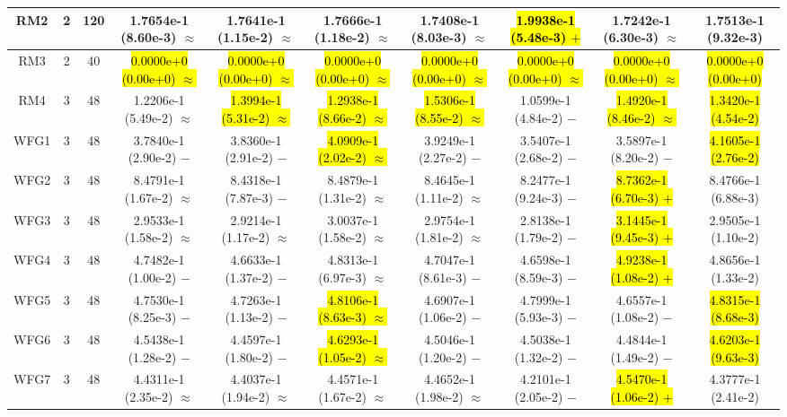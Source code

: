 \documentclass[journal]{IEEEtran}
\begin{document}
\begin{table*}[htbp]
\begin{tabular}{cccccccccc}
\hline
\multirow{1}{*}{RM2}&2&120&1.7654e-1 (8.60e-3) $\approx$&1.7641e-1 (1.15e-2) $\approx$&1.7666e-1 (1.18e-2) $\approx$&1.7408e-1 (8.03e-3) $\approx$&\hl{1.9938e-1 (5.48e-3) $+$}&1.7242e-1 (6.30e-3) $\approx$&1.7513e-1 (9.32e-3)\\
\hline
\multirow{1}{*}{RM3}&2&40&\hl{0.0000e+0 (0.00e+0) $\approx$}&\hl{0.0000e+0 (0.00e+0) $\approx$}&\hl{0.0000e+0 (0.00e+0) $\approx$}&\hl{0.0000e+0 (0.00e+0) $\approx$}&\hl{0.0000e+0 (0.00e+0) $\approx$}&\hl{0.0000e+0 (0.00e+0) $\approx$}&\hl{0.0000e+0 (0.00e+0)}\\
\hline
\multirow{1}{*}{RM4}&3&48&1.2206e-1 (5.49e-2) $\approx$&\hl{1.3994e-1 (5.31e-2) $\approx$}&\hl{1.2938e-1 (8.66e-2) $\approx$}&\hl{1.5306e-1 (8.55e-2) $\approx$}&1.0599e-1 (4.84e-2) $-$&\hl{1.4920e-1 (8.46e-2) $\approx$}&\hl{1.3420e-1 (4.54e-2)}\\
\hline
\multirow{1}{*}{WFG1}&3&48&3.7840e-1 (2.90e-2) $-$&3.8360e-1 (2.91e-2) $-$&\hl{4.0909e-1 (2.02e-2) $\approx$}&3.9249e-1 (2.27e-2) $-$&3.5407e-1 (2.68e-2) $-$&3.5897e-1 (8.20e-2) $-$&\hl{4.1605e-1 (2.76e-2)}\\
\hline
\multirow{1}{*}{WFG2}&3&48&8.4791e-1 (1.67e-2) $\approx$&8.4318e-1 (7.87e-3) $-$&8.4879e-1 (1.31e-2) $\approx$&8.4645e-1 (1.11e-2) $\approx$&8.2477e-1 (9.24e-3) $-$&\hl{8.7362e-1 (6.70e-3) $+$}&8.4766e-1 (6.88e-3)\\
\hline
\multirow{1}{*}{WFG3}&3&48&2.9533e-1 (1.58e-2) $\approx$&2.9214e-1 (1.17e-2) $\approx$&3.0037e-1 (1.58e-2) $\approx$&2.9754e-1 (1.81e-2) $\approx$&2.8138e-1 (1.79e-2) $-$&\hl{3.1445e-1 (9.45e-3) $+$}&2.9505e-1 (1.10e-2)\\
\hline
\multirow{1}{*}{WFG4}&3&48&4.7482e-1 (1.00e-2) $-$&4.6633e-1 (1.37e-2) $-$&4.8313e-1 (6.97e-3) $\approx$&4.7047e-1 (8.61e-3) $-$&4.6598e-1 (8.59e-3) $-$&\hl{4.9238e-1 (1.08e-2) $+$}&4.8656e-1 (1.33e-2)\\
\hline
\multirow{1}{*}{WFG5}&3&48&4.7530e-1 (8.25e-3) $-$&4.7263e-1 (1.13e-2) $-$&\hl{4.8106e-1 (8.63e-3) $\approx$}&4.6907e-1 (1.06e-2) $-$&4.7999e-1 (5.93e-3) $-$&4.6557e-1 (1.08e-2) $-$&\hl{4.8315e-1 (8.68e-3)}\\
\hline
\multirow{1}{*}{WFG6}&3&48&4.5438e-1 (1.28e-2) $-$&4.4597e-1 (1.80e-2) $-$&\hl{4.6293e-1 (1.05e-2) $\approx$}&4.5046e-1 (1.20e-2) $-$&4.5038e-1 (1.32e-2) $-$&4.4844e-1 (1.49e-2) $-$&\hl{4.6203e-1 (9.63e-3)}\\
\hline
\multirow{1}{*}{WFG7}&3&48&4.4311e-1 (2.35e-2) $\approx$&4.4037e-1 (1.94e-2) $\approx$&4.4571e-1 (1.67e-2) $\approx$&4.4652e-1 (1.98e-2) $\approx$&4.2101e-1 (2.05e-2) $-$&\hl{4.5470e-1 (1.06e-2) $+$}&4.3777e-1 (2.41e-2)\\

\end{tabular}
\end{table*}
\end{document}

